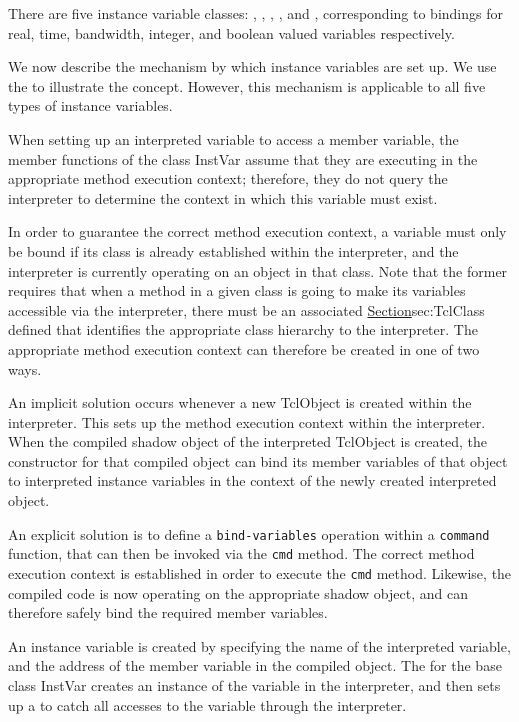 There are five instance variable classes:
,
,
,
,
and ,
corresponding to bindings for real, time, bandwidth, integer, and
boolean valued variables respectively.

We now describe the mechanism by which instance variables are set up.
We use the 
to illustrate the concept.
However, this mechanism is applicable to all five types of instance variables.

When setting up an interpreted variable to access a member variable,
the member functions of the class InstVar assume that they are executing
in the appropriate method execution context;
therefore, they do not query the interpreter to determine the context in
which this variable must exist.

In order to guarantee the correct method execution context,
a variable must only be bound if its class is already established within
the interpreter, and
the interpreter is currently operating on an object in that class.
Note that the former requires that when a method in a given class is
going to make its variables accessible via the interpreter,
there must be an associated 
\href{class TclClass}{Section}{sec:TclClass}
defined that identifies the appropriate class hierarchy to the interpreter.
The appropriate method execution context can therefore be created in one
of two ways.

An implicit solution occurs whenever a new TclObject is created within
the interpreter.
This sets up the method execution context within the interpreter.
When the compiled shadow object of the interpreted TclObject is created,
the constructor for that compiled object can bind its member variables
of that object
to interpreted instance variables in the context of the newly created
interpreted object.

An explicit solution is to define a {\tt bind-variables} operation
within a {\tt command} function, that can then be invoked via the
{\tt cmd} method.
The correct method execution context is established in order to execute
the {\tt cmd} method.
Likewise, the compiled code is now operating on the appropriate
shadow object, and can therefore safely bind the required member variables.

An instance variable is created by specifying the name of the
interpreted variable, and the address of the member variable in the
compiled object.
The
for the base class InstVar 
creates an instance of the variable in the interpreter,
and then sets up a
to  catch all accesses to the variable through the interpreter.

